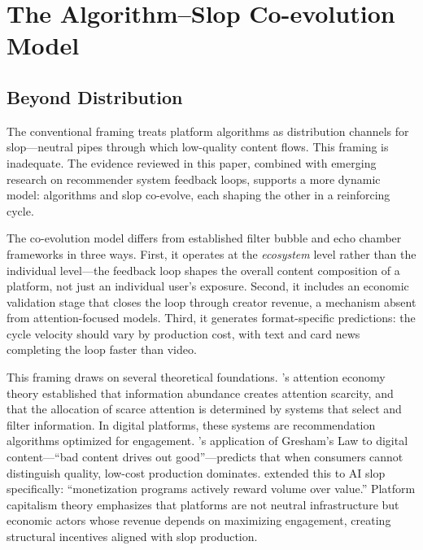 \documentclass[12pt,a4paper]{article}
\begin{document}
\section{The Algorithm--Slop Co-evolution Model}
\label{sec:coevolution}

\subsection{Beyond Distribution}

The conventional framing treats platform algorithms as distribution channels for slop---neutral pipes through which low-quality content flows. This framing is inadequate. The evidence reviewed in this paper, combined with emerging research on recommender system feedback loops, supports a more dynamic model: algorithms and slop co-evolve, each shaping the other in a reinforcing cycle.

The co-evolution model differs from established filter bubble and echo chamber frameworks \parencite{Pariser2011,Sunstein2017} in three ways. First, it operates at the \emph{ecosystem} level rather than the individual level---the feedback loop shapes the overall content composition of a platform, not just an individual user's exposure. Second, it includes an economic validation stage that closes the loop through creator revenue, a mechanism absent from attention-focused models. Third, it generates format-specific predictions: the cycle velocity should vary by production cost, with text and card news completing the loop faster than video.

This framing draws on several theoretical foundations. \textcite{Simon1971}'s attention economy theory established that information abundance creates attention scarcity, and that the allocation of scarce attention is determined by systems that select and filter information. In digital platforms, these systems are recommendation algorithms optimized for engagement. \textcite{Grimmelmann2009}'s application of Gresham's Law to digital content---``bad content drives out good''---predicts that when consumers cannot distinguish quality, low-cost production dominates. \textcite{MadsenPuyt2025} extended this to AI slop specifically: ``monetization programs actively reward volume over value.'' Platform capitalism theory \parencite{Srnicek2017} emphasizes that platforms are not neutral infrastructure but economic actors whose revenue depends on maximizing engagement, creating structural incentives aligned with slop production.
\end{document}
